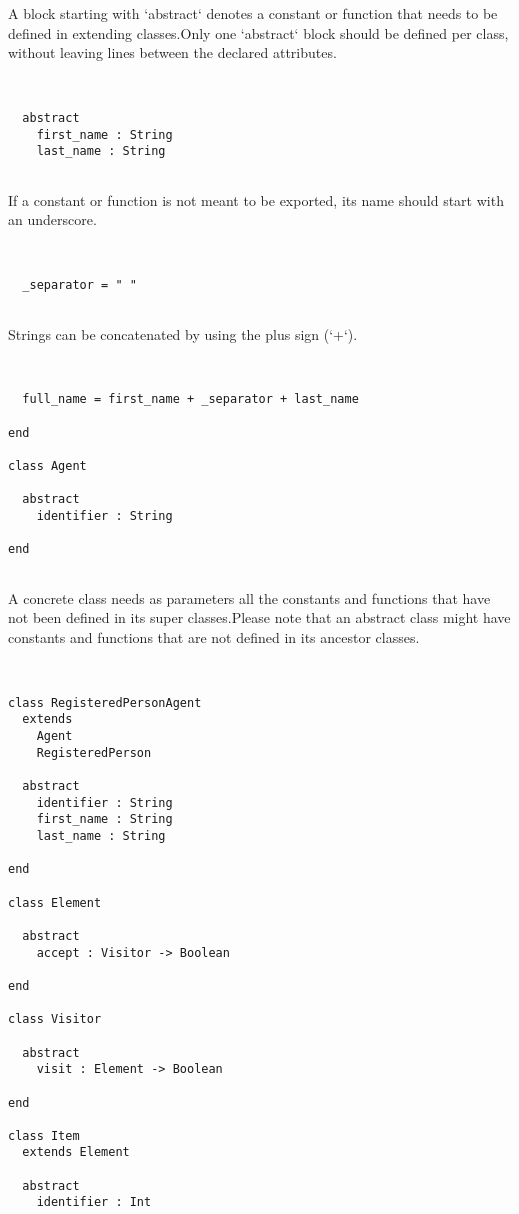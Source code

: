 \documentclass[12pt,a4paper]{article}
\begin{document}
A block starting with `abstract` denotes a constant or function that needs to be defined in extending classes.Only one `abstract` block should be defined per class, without leaving lines between the declared attributes. 


\begin{lstlisting}


  abstract
    first_name : String
    last_name : String


\end{lstlisting}

If a constant or function is not meant to be exported, its name should start with an underscore. 


\begin{lstlisting}


  _separator = " "


\end{lstlisting}

Strings can be concatenated by using the plus sign (`+`). 


\begin{lstlisting}


  full_name = first_name + _separator + last_name

end

class Agent

  abstract
    identifier : String

end


\end{lstlisting}

A concrete class needs as parameters all the constants and functions that have not been defined in its super classes.Please note that an abstract class might have constants and functions that are not defined in its ancestor classes. 


\begin{lstlisting}


class RegisteredPersonAgent
  extends
    Agent
    RegisteredPerson

  abstract
    identifier : String
    first_name : String
    last_name : String

end

class Element

  abstract
    accept : Visitor -> Boolean

end

class Visitor

  abstract
    visit : Element -> Boolean

end

class Item
  extends Element

  abstract
    identifier : Int


\end{lstlisting}
\end{document}
